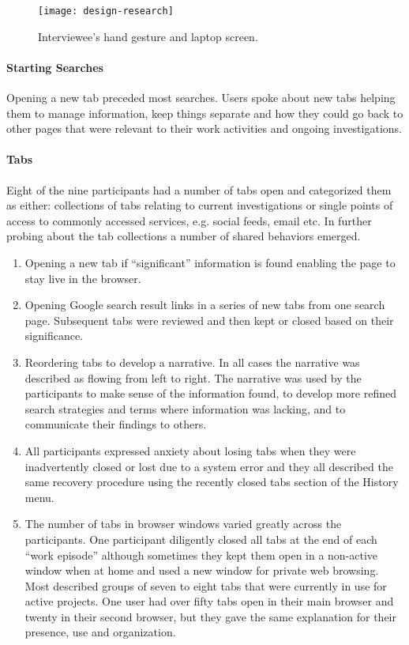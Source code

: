 \begin{figure}
	\centering
	\texttt{[image: design-research]}
	\caption{Interviewee's hand gesture and laptop screen.}
	\label{fig:sm-design-research}
\end{figure}

\paragraph{Starting Searches}
Opening a new tab preceded most searches. Users spoke about new tabs helping them to manage information, keep things separate and how they could go back to other pages that were relevant to their work activities and ongoing investigations.

\paragraph{Tabs}
Eight of the nine participants had a number of tabs open and categorized them as either: collections of tabs relating to current investigations or single points of access to commonly accessed services, e.g. social feeds, email etc. In further probing about the tab collections a number of shared behaviors emerged.

\begin{enumerate}
	\item Opening a new tab if ``significant'' information is found enabling the page to stay live in the browser.
	\item Opening Google search result links in a series of new tabs from one search page. Subsequent tabs were reviewed and then kept or closed based on their significance.
	\item Reordering tabs to develop a narrative. In all cases the narrative was described as flowing from left to right. The narrative was used by the participants to make sense of the information found, to develop more refined search strategies and terms where information was lacking, and to communicate their findings to others.
	\item All participants expressed anxiety about losing tabs when they were inadvertently closed or lost due to a system error and they all described the same recovery procedure using the recently closed tabs section of the History menu.
	\item The number of tabs in browser windows varied greatly across the participants. One participant diligently closed all tabs at the end of each ``work episode'' although sometimes they kept them open in a non-active window when at home and used a new window for private web browsing. Most described groups of seven to eight tabs that were currently in use for active projects. One user had over fifty tabs open in their main browser and twenty in their second browser, but they gave the same explanation for their presence, use and organization.
\end{enumerate}

